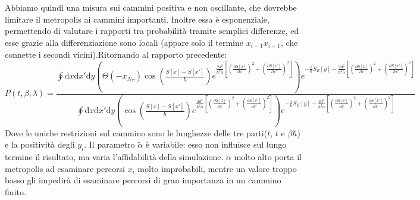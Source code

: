 \documentclass[italian]{article}
\newcommand{\dderiv}[2]{\frac{\partial #1}{\partial #2}}
\begin{document}
	Abbiamo quindi una misura sui cammini positiva e non oscillante, che dovrebbe limitare il metropolis ai cammini importanti. Inoltre essa è esponenziale, permettendo di valutare i rapporti tra probabilità tramite semplici differenze, ed esse grazie alla differenziazione sono locali (appare solo il termine $x_{i-1}x_{i+1}$, che connette i secondi vicini).Ritornando al rapporto precedente:
	\begin{equation}
	P(t,\beta, \lambda) =  \frac{
		\oint \mathrm{d}x\mathrm{d}x'\mathrm{d}y 
	\left(\Theta(-x_{N_T})\cos\left(\frac{S[x]-S[x']}{\hbar}\right)
	e^{\frac{2d^2}{\hbar^2\tilde{\alpha}}\left[ \left(\dderiv{S[x]}{x}\right)^2 +\left(\dderiv{S[x']}{x'}\right)^2 \right]}\right)
	e^{-\frac{1}{\hbar}S_E[y] - \frac{2d^2}{\hbar^2\tilde{\alpha}}\left[ \left(\dderiv{S[x]}{x}\right)^2 +\left(\dderiv{S[x']}{x'}\right)^2 \right]}
}{
	\oint \mathrm{d}x\mathrm{d}x'\mathrm{d}y 
	\left(\cos\left(\frac{S[x]-S[x']}{\hbar}\right)
	e^{\frac{2d^2}{\hbar^2\tilde{\alpha}}\left[ \left(\dderiv{S[x]}{x}\right)^2 +\left(\dderiv{S[x']}{x'}\right)^2 \right]}\right)
	e^{-\frac{1}{\hbar}S_E[y] - \frac{2d^2}{\hbar^2\tilde{\alpha}}\left[ \left(\dderiv{S[x]}{x}\right)^2 +\left(\dderiv{S[x']}{x'}\right)^2 \right]}
}
	\end{equation}
	Dove le uniche restrizioni sul cammino sono le lunghezze delle tre parti($t$, $t$ e $\beta\hbar$) e la positività degli $y_i$.
	Il parametro $\tilde{\alpha}$ è variabile: esso non influisce sul lungo termine il risultato, ma varia l'affidabilità della simulazione. $\tilde{\alpha}$ molto alto porta il metropolis ad esaminare percorsi $x_i$ molto improbabili, mentre un valore troppo basso gli impedirà di esaminare percorsi di gran importanza in un cammino finito.
\end{document}
